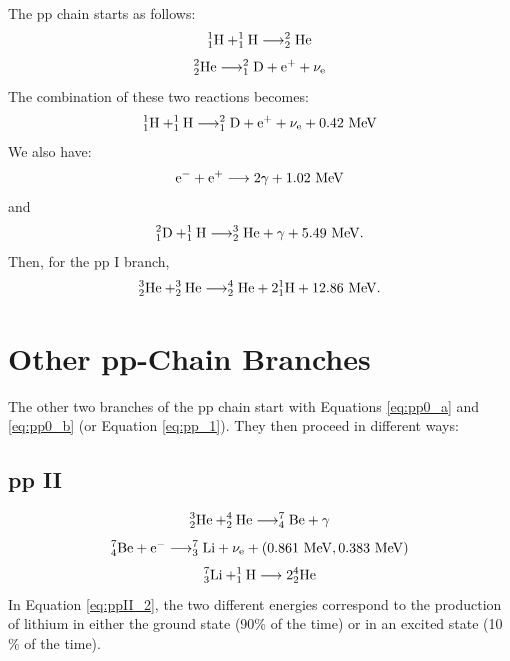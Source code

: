 \documentclass[12pt,preprint]{aastex}
\begin{document}
The pp chain starts as follows:
\begin{equation}
^1_1{\rm H} + ^1_1{\rm H} \longrightarrow ^2_2{\rm He}
\label{eq:pp0_a}
\end{equation}
\begin{equation}
^2_2{\rm He} \longrightarrow ^2_1{\rm D} + {\rm e}^+ + \nu_{\rm e}
\label{eq:pp0_b}
\end{equation}
The combination of these two reactions becomes:
\begin{equation}
^1_1{\rm H} + ^1_1{\rm H} \longrightarrow ^2_1{\rm D} + {\rm e}^+ + \nu_{\rm e} + 0.42~{\rm MeV}
\label{eq:pp_1}
\end{equation}
We also have:
\begin{equation}
{\rm e}^- + {\rm e}^+ \longrightarrow 2\gamma + 1.02~{\rm MeV}
\label{eq:pp_2}
\end{equation}
and
\begin{equation}
^2_1{\rm D} + ^1_1{\rm H} \longrightarrow ^3_2{\rm He} + \gamma + 5.49~{\rm MeV}.
\label{eq:pp_3}
\end{equation}
Then, for the pp I branch, 
\begin{equation}
^3_2{\rm He} + ^3_2{\rm He} \longrightarrow ^4_2{\rm He} + 2^1_1{\rm H} + 12.86~{\rm MeV}.
\label{eq:pp_4}
\end{equation}

\section{Other pp-Chain Branches}

The other two branches of the pp chain start with Equations \ref{eq:pp0_a} and \ref{eq:pp0_b} (or Equation \ref{eq:pp_1}). They then proceed in different ways:

\subsection{pp II}

\begin{equation}
^3_2{\rm He} + ^4_2{\rm He} \longrightarrow ^7_4{\rm Be} + \gamma
\end{equation}
\begin{equation}
^7_4{\rm Be} + {\rm e}^- \longrightarrow ^7_3{\rm Li} + \nu_{\rm e} + (0.861~{\rm MeV},0.383~{\rm MeV})
\label{eq:ppII_2}
\end{equation}
\begin{equation}
^7_3{\rm Li} + ^1_1{\rm H} \longrightarrow 2 ^4_2{\rm He}
\end{equation}
In Equation \ref{eq:ppII_2}, the two different energies correspond to the production of lithium in either the ground state (90\% of the time) or in an excited state (10 \% of the time).
\end{document}
